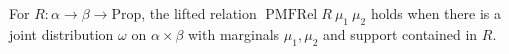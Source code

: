 \begin{definition}
  \label{def:pmfrel}
  \leanok
  For $R : \alpha \to \beta \to \mathrm{Prop}$, the lifted relation $\operatorname{PMFRel} R\ \mu_1\ \mu_2$ holds when there is a joint distribution $\omega$ on $\alpha \times \beta$ with marginals $\mu_1, \mu_2$ and support contained in $R$.
\end{definition}
